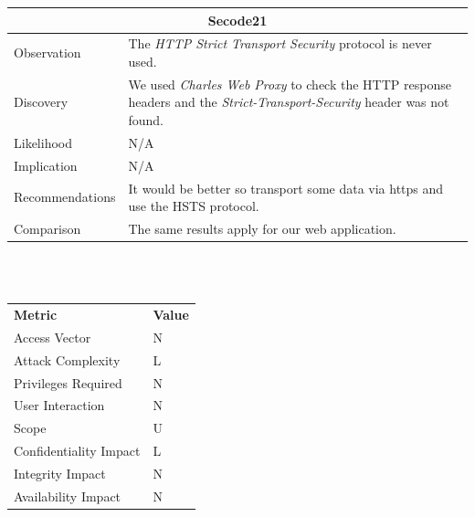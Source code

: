 \documentclass[headsepline,footsepline,footinclude=false,oneside,fontsize=11pt,paper=a4,listof=totoc,bibliography=totoc]{scrbook} %
\begin{document}
\begin{tabular}{ l|p{11cm}  }
	\hline
	\multicolumn{2}{c}{\textbf{Secode21}} \\ 
	\hline
	Observation   & The \textit{HTTP Strict Transport Security} protocol is never used. \\
	Discovery  & We used \textit{Charles Web Proxy} to check the HTTP response headers and the \textit{Strict-Transport-Security} header was not found. \\
	Likelihood & N/A \\
	Implication    & N/A \\
	Recommendations & It would be better so transport some data via https and use the HSTS protocol. \\
	Comparison& The same results apply for our web application. \\  
	\hline
\end{tabular}
\\
\vspace{0.5cm}
\\
\begin{center}
	\begin{tabular}{ll}
		\rowcolor[HTML]{34CDF9} 
		{\color[HTML]{ECF4FF} \textbf{Metric}}        & {\color[HTML]{ECF4FF} \textbf{Value}} \\
		\rowcolor[HTML]{BBDAFF} 
		{\color[HTML]{333333} Access Vector}          & {\color[HTML]{333333} } N              \\
		\rowcolor[HTML]{ECF4FF} 
		{\color[HTML]{333333} Attack Complexity}      & {\color[HTML]{333333} } L              \\
		\rowcolor[HTML]{BBDAFF} 
		{\color[HTML]{333333} Privileges Required}    & {\color[HTML]{333333} } N              \\
		\rowcolor[HTML]{ECF4FF} 
		{\color[HTML]{333333} User Interaction}       & {\color[HTML]{333333} } N              \\
		\rowcolor[HTML]{BBDAFF} 
		{\color[HTML]{333333} Scope}                  & {\color[HTML]{333333} } U              \\
		\rowcolor[HTML]{ECF4FF} 
		{\color[HTML]{333333} Confidentiality Impact} & {\color[HTML]{333333} } L              \\
		\rowcolor[HTML]{BBDAFF} 
		{\color[HTML]{333333} Integrity Impact}       & {\color[HTML]{333333} } N              \\
		\rowcolor[HTML]{ECF4FF} 
		{\color[HTML]{333333} Availability Impact}    & {\color[HTML]{333333} } N             
	\end{tabular}
\end{center}
\end{document}
